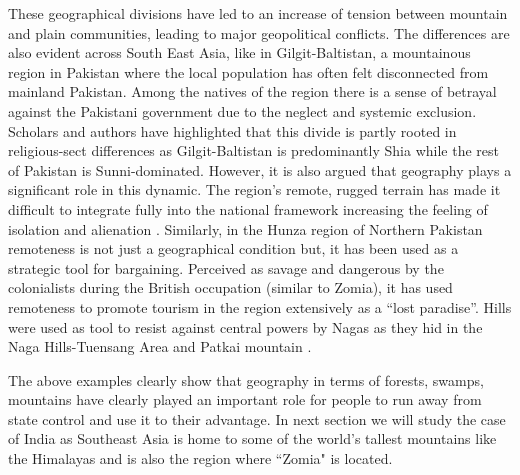 \begin{sloppypar}
These geographical divisions have led to an increase of tension between mountain and plain communities,  leading to major geopolitical conflicts. The differences are also evident across South East Asia, like in Gilgit\hyp{}Baltistan, a mountainous region in Pakistan where the local population has often felt disconnected from mainland Pakistan. Among the natives of the region there is a sense of betrayal  against the Pakistani government due to the neglect and systemic exclusion. Scholars and authors have highlighted that this divide is partly rooted in religious\hyp{}sect differences as Gilgit\hyp{}Baltistan is predominantly Shia while the rest of Pakistan is  Sunni\hyp{}dominated. However, it is also argued that geography plays a significant role in this dynamic. The region's remote, rugged terrain has  made it difficult to integrate fully into the national framework  increasing the feeling of isolation and alienation \citep{ali2019delusional}. Similarly, in the Hunza region of Northern Pakistan  remoteness is not just a geographical condition but, it has been used as a strategic tool for bargaining. Perceived as savage and dangerous by the colonialists during the British occupation (similar to Zomia), it has used remoteness to promote tourism in the region extensively as a \enquote{lost paradise}. Hills were used as tool to resist against central powers by Nagas as they hid in the Naga Hills\hyp{}Tuensang Area and Patkai mountain \citep{kapai2020spatial}.  

The above examples clearly show that geography in terms of forests, swamps, mountains have clearly played an important role for people to run away from state control and use it to their advantage. In next section we will study the case of India as Southeast Asia is home to some of the world's tallest mountains like the Himalayas and is also the region where ``Zomia" is located.


\end{sloppypar}

